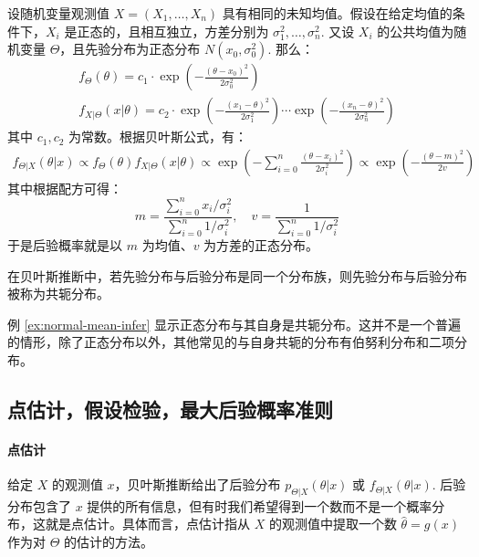 \begin{example}[正态随机变量公共均值的推断]
\label{ex:normal-mean-infer}
设随机变量观测值 $X=(X_1,\ldots,X_n)$ 具有相同的未知均值。假设在给定均值的条件下，$X_i$ 是正态的，且相互独立，方差分别为 $\sigma_1^2,\ldots,\sigma_n^2$. 又设 $X_i$ 的公共均值为随机变量 $\Theta$，且先验分布为正态分布 $N(x_0,\sigma_0^2)$. 那么：
\begin{gather*}
f_\Theta(\theta)=c_1\cdot\exp\left(-\frac{(\theta-x_0)^2}{2\sigma_0^2}\right)\\
f_{X\vert\Theta}(x\vert\theta)=c_2\cdot\exp\left(-\frac{(x_1-\theta)^2}{2\sigma_1^2}\right)\cdots\exp\left(-\frac{(x_n-\theta)^2}{2\sigma_n^2}\right)
\end{gather*}
其中 $c_1,c_2$ 为常数。根据贝叶斯公式，有：
\begin{align*}
f_{\Theta\vert X}(\theta\vert x)\propto f_\Theta(\theta)f_{X\vert\Theta}(x\vert\theta)\propto\exp\left(-\sum_{i=0}^n\frac{(\theta-x_i)^2}{2\sigma_i^2}\right)\propto\exp\left(-\frac{(\theta-m)^2}{2v}\right)
\end{align*}
其中根据配方可得：
\[
m=\frac{\sum_{i=0}^nx_i/\sigma_i^2}{\sum_{i=0}^n1/\sigma_i^2},\quad v=\frac{1}{\sum_{i=0}^n1/\sigma_i^2}
\]
于是后验概率就是以 $m$ 为均值、$v$ 为方差的正态分布。
\end{example}

\begin{definition}[共轭分布]
在贝叶斯推断中，若先验分布与后验分布是同一个分布族，则先验分布与后验分布被称为共轭分布。
\end{definition}
\begin{com}
例 \ref{ex:normal-mean-infer} 显示正态分布与其自身是共轭分布。这并不是一个普遍的情形，除了正态分布以外，其他常见的与自身共轭的分布有伯努利分布和二项分布。
\end{com}


\subsection{点估计，假设检验，最大后验概率准则}

\paragraph{点估计}
给定 $X$ 的观测值 $x$，贝叶斯推断给出了后验分布 $p_{\Theta\vert X}(\theta\vert x)$ 或 $f_{\Theta\vert X}(\theta\vert x)$. 后验分布包含了 $x$ 提供的所有信息，但有时我们希望得到一个数而不是一个概率分布，这就是点估计。具体而言，点估计指从 $X$ 的观测值中提取一个数 $\hat\theta=g(x)$ 作为对 $\Theta$ 的估计的方法。

